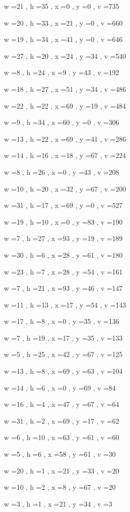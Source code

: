 \documentclass[11pt]{article}
\begin{document}
w =21 , h =35 , x =0 , y =0 , v =735
\par
w =20 , h =33 , x =21 , y =0 , v =660
\par
w =19 , h =34 , x =41 , y =0 , v =646
\par
w =27 , h =20 , x =24 , y =34 , v =540
\par
w =8 , h =24 , x =9 , y =43 , v =192
\par
w =18 , h =27 , x =51 , y =34 , v =486
\par
w =22 , h =22 , x =69 , y =19 , v =484
\par
w =9 , h =34 , x =60 , y =0 , v =306
\par
w =13 , h =22 , x =69 , y =41 , v =286
\par
w =14 , h =16 , x =18 , y =67 , v =224
\par
w =8 , h =26 , x =0 , y =43 , v =208
\par
w =10 , h =20 , x =32 , y =67 , v =200
\par
w =31 , h =17 , x =69 , y =0 , v =527
\par
w =19 , h =10 , x =0 , y =83 , v =190
\par
w =7 , h =27 , x =93 , y =19 , v =189
\par
w =30 , h =6 , x =28 , y =61 , v =180
\par
w =23 , h =7 , x =28 , y =54 , v =161
\par
w =7 , h =21 , x =93 , y =46 , v =147
\par
w =11 , h =13 , x =17 , y =54 , v =143
\par
w =17 , h =8 , x =0 , y =35 , v =136
\par
w =7 , h =19 , x =17 , y =35 , v =133
\par
w =5 , h =25 , x =42 , y =67 , v =125
\par
w =13 , h =8 , x =69 , y =63 , v =104
\par
w =14 , h =6 , x =0 , y =69 , v =84
\par
w =16 , h =4 , x =47 , y =67 , v =64
\par
w =31 , h =2 , x =69 , y =17 , v =62
\par
w =6 , h =10 , x =63 , y =61 , v =60
\par
w =5 , h =6 , x =58 , y =61 , v =30
\par
w =20 , h =1 , x =21 , y =33 , v =20
\par
w =10 , h =2 , x =8 , y =67 , v =20
\par
w =3 , h =1 , x =21 , y =34 , v =3
\par
\newpage
\end{document}
